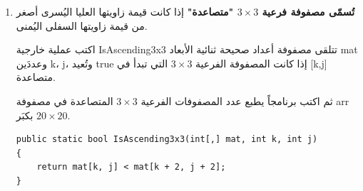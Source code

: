 \documentclass[14pt]{extarticle}
\begin{document}
\begin{enumerate}[itemsep=2em]
ثم اكتب عملية خارجية \textenglish{CountUniform2x2} تتلقى مصفوفة \textenglish{mat} وتُعيد عدد المصفوفات الفرعية $2\times2$ المتجانسة فيها.

\begin{boxExample}
في المصفوفة \textenglish{\{\{3,3,1\},\{3,3,2\},\{4,5,6\}\}}: توجد مصفوفة فرعية متجانسة واحدة تبدأ في \textenglish{[0,0]} (كلها 3).
\end{boxExample}

\ifwithsols
\begin{boxSolution}
\begin{boxCode}
\begin{english}
\begin{verbatim}
public static bool IsUniform2x2(int[,] mat, int k, int j)
{
    int val = mat[k, j];
    return mat[k,   j+1] == val &&
           mat[k+1, j  ] == val &&
           mat[k+1, j+1] == val;
}

public static int CountUniform2x2(int[,] mat)
{
    int count = 0;
    for (int i = 0; i <= mat.GetLength(0) - 2; i++)
        for (int j = 0; j <= mat.GetLength(1) - 2; j++)
            if (IsUniform2x2(mat, i, j))
                count++;
    return count;
}
\end{verbatim}
\end{english}
\end{boxCode}
\textbf{الشرح:} في \textenglish{IsUniform2x2} نقارن الثلاثة عناصر الأخرى بالأول. الحلقتان في \textenglish{CountUniform2x2} تتوقفان عند \textenglish{rows-2} وـ\textenglish{cols-2} لأن النافذة تحتاج صفَّين وعمودَين ابتداءً من الموضع الحالي.
\end{boxSolution}
\fi

\clearpage
\item
\textbf{تُسمّى مصفوفة فرعية $3\times3$ "متصاعدة"} إذا كانت قيمة زاويتها العليا اليُسرى أصغر من قيمة زاويتها السفلى اليُمنى.

اكتب عملية خارجية \textenglish{IsAscending3x3} تتلقى مصفوفة أعداد صحيحة ثنائية الأبعاد \textenglish{mat} وعددَين \textenglish{k}، \textenglish{j}، وتُعيد \textenglish{true} إذا كانت المصفوفة الفرعية $3\times3$ التي تبدأ في \textenglish{[k,j]} متصاعدة.

ثم اكتب برنامجاً يطبع عدد المصفوفات الفرعية $3\times3$ المتصاعدة في مصفوفة \textenglish{arr} بكبَر $20\times20$.

\ifwithsols
\begin{boxSolution}
\begin{boxCode}
\begin{english}
\begin{verbatim}
public static bool IsAscending3x3(int[,] mat, int k, int j)
{
    return mat[k, j] < mat[k + 2, j + 2];
}


\end{verbatim}
\end{english}
\end{boxCode}
\end{boxSolution}
\end{enumerate}
\end{document}
